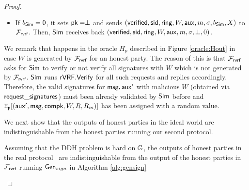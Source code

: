 \begin{proof}
\begin{itemize}
\begin{itemize}
			\item If $ b_{\mathsf{Sim}} = 0 $, it sets $ \mathsf{pk} = \perp $ and sends  $ (\mathsf{verified}, \textsf{sid}, \mathsf{ring}, W,\mathsf{aux}, m, \sigma, b_{\mathsf{Sim}}, X) $ to $ \mathcal{F}_{\textsf{rvrf}} $. Then, $ \mathsf{Sim} $ receives back $ (\mathsf{verified}, \textsf{sid}, \mathsf{ring}, W, \mathsf{aux},m, \sigma, \perp, 0) $. 
			
		\end{itemize}
		
		
		
		
		
		
	\end{itemize}
	
	We remark that  happens in the oracle $ H_p $ described in Figure \ref{oracle:Hout} in case  $ W $ is generated by $ \mathcal{F}_{\textsf{rvrf}} $ for an honest party. The reason of this is that $ \mathcal{F}_{\textsf{rvrf}} $ asks for $ \mathsf{Sim} $ to verify or not verify all signatures with  $ W $ which is not generated by $ \mathcal{F}_{\textsf{rvrf}} $. $ \mathsf{Sim} $ runs $ {\mathsf{rVRF}}.{\mathsf{Verify}} $ for all such requests and replies accordingly. Therefore, the valid signatures for $ \mathsf{msg}, \mathsf{aux}' $ with malicious $ W $ (obtained via $ \mathsf{request\_signatures} $) must been already validated by $ \mathsf{Sim} $ before and $ \mathtt{H_p}[(\mathsf{aux}', \mathsf{msg},\mathsf{compk},W,R,R_m)] $ has been assigned with a random value. 
	
	We next show that the outputs of honest parties in the ideal world are indistinguishable from the honest parties running our second protocol. 
	
	\begin{lemma}\label{lem:honestoutput}
		Assuming that the DDH problem is hard on $ {\mathbb{G}} $, the outputs of honest parties in the real protocol \name\ are indistinguishable from the output of the honest parties in $ \mathcal{F}_{\textsf{rvrf}} $ running $ \mathsf{Gen}_{sign} $  in Algorithm \ref{alg:gensign}
	\end{lemma}


\end{proof}
